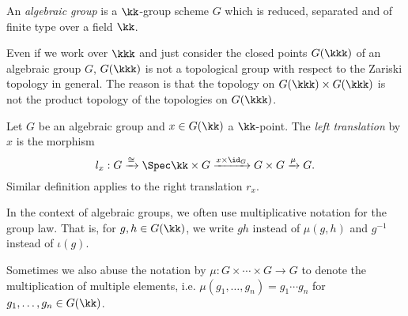     \begin{definition}\label{def:algebraic_group}
        An \emph{algebraic group} is a \(\kk\)-group scheme \(G\) which is reduced, separated and of finite type over a field \(\kk\).
    \end{definition}

    \begin{remark}\label{rmk:algebraic_group_is_not_topological_group}
        Even if we work over \(\kkk\) and just consider the closed points \(G(\kkk)\) of an algebraic group \(G\), \(G(\kkk)\) is not a topological group with respect to the Zariski topology in general.
        The reason is that the topology on \(G(\kkk) \times G(\kkk)\) is not the product topology of the topologies on \(G(\kkk)\).
    \end{remark}

    \begin{definition}\label{def:transition_morphism}
        Let \(G\) be an algebraic group and \(x \in G(\kk)\) a \(\kk\)-point.
        The \emph{left translation} by \(x\) is the morphism
        \[
            l_x: G \xrightarrow{\cong} \Spec \kk \times G \xrightarrow{x \times \id_G} G \times G \xrightarrow{\mu} G.
        \]
        Similar definition applies to the right translation \(r_x\).
    \end{definition}

    \begin{remark}\label{rmk:notation_of_multiplication_and_inverse}
        In the context of algebraic groups, we often use multiplicative notation for the group law.
        That is, for \(g,h \in G(\kk)\), we write \(gh\) instead of \(\mu(g,h)\) and \(g^{-1}\) instead of \(\iota(g)\).
        
        Sometimes we also abuse the notation by \(\mu:G \times \cdots \times G \to G\) to denote the multiplication of multiple elements, i.e. \(\mu(g_1,\ldots,g_n) = g_1 \cdots g_n\) for \(g_1,\ldots,g_n \in G(\kk)\).
    \end{remark}


